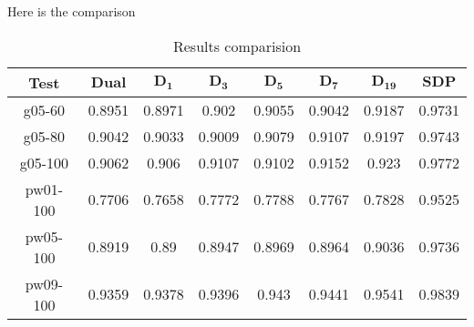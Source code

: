 \documentclass{article}
\newcommand{\SDP}{\mathbf{SDP}}
\newcommand{\Dual}{\mathbf{Dual}}
\begin{document}
 Here is the comparison 
\begin{table}[ht]
        \centering

\begin{tabular}{|c|c|c|c|c|c|c|c|}

         \hline
         Test & $\Dual$ & $\mathbf{D_1}$ & $\mathbf{D_3}$ & $\mathbf{D_5}$ & $\mathbf{D_7}$ & $\mathbf{D_{19}}$ & $\SDP$ \\ [0.5ex] 
         \hline
         g05-60   & 0.8951 & 0.8971 & 0.902 & 0.9055 & 0.9042 & 0.9187 & 0.9731 \\ 
         \hline
         g05-80   & 0.9042 & 0.9033 & 0.9009 & 0.9079 & 0.9107 & 0.9197 & 0.9743 \\ 
         \hline
         g05-100  & 0.9062 & 0.906 & 0.9107 & 0.9102 & 0.9152 & 0.923 & 0.9772 \\ 
         \hline
         pw01-100 & 0.7706 & 0.7658 & 0.7772 & 0.7788 & 0.7767 & 0.7828 & 0.9525  \\ 
         \hline
         pw05-100 & 0.8919 & 0.89 & 0.8947 & 0.8969 & 0.8964 & 0.9036 & 0.9736 \\ 
         \hline
         pw09-100 & 0.9359 & 0.9378 & 0.9396 & 0.943 & 0.9441 & 0.9541 & 0.9839 \\
         \hline
        \end{tabular}
        \caption{Results comparision}
    \end{table}
\end{document}
